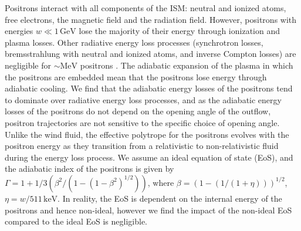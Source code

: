\documentclass[a4paper,fleqn,usenatbib]{mnras}
\begin{document}
Positrons interact with all components of the ISM: neutral and ionized atoms, free electrons, the magnetic field and the radiation field. However, positrons with energies $w\ll 1\,\mathrm{GeV}$ lose the majority of their energy through ionization and plasma losses. Other radiative energy loss processes (synchrotron losses, bremsstrahlung with neutral and ionized atoms, and inverse Compton losses) are negligible for $\sim\mathrm{MeV}$ positrons \citep{Prantzos11}. The adiabatic expansion of the plasma in which the positrons are embedded mean that the positrons lose energy through adiabatic cooling. We find that the adiabatic energy losses of the positrons tend to dominate over radiative energy loss processes, and as the adiabatic energy losses of the positrons do not depend on the opening angle of the outflow, positron trajectories are not sensitive to the specific choice of opening angle. Unlike the wind fluid, the effective polytrope for the positrons evolves with the positron energy as they transition from a relativistic to non-relativistic fluid during the energy loss process. We assume an ideal equation of state (EoS), and the adiabatic index of the positrons is given by $\Gamma = 1+1/3(\beta^2/(1-(1-\beta^2)^{1/2}))$, where $\beta = (1-(1/(1+\eta)))^{1/2}$, $\eta = w/511\,\mathrm{keV}$. In reality, the EoS is dependent on the internal energy of the positrons and hence non-ideal, however we find the impact of the non-ideal EoS compared to the ideal EoS is negligible.
\end{document}
